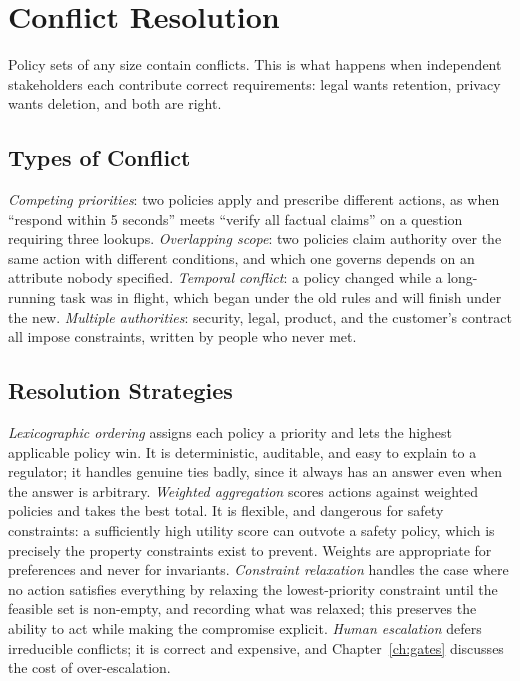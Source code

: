 \documentclass[11pt]{book}
\begin{document}
\section{Conflict Resolution}

Policy sets of any size contain conflicts. This is what happens when independent stakeholders each contribute correct requirements: legal wants retention, privacy wants deletion, and both are right.

\subsection{Types of Conflict}

\textit{Competing priorities}: two policies apply and prescribe different actions, as when ``respond within 5 seconds'' meets ``verify all factual claims'' on a question requiring three lookups. \textit{Overlapping scope}: two policies claim authority over the same action with different conditions, and which one governs depends on an attribute nobody specified. \textit{Temporal conflict}: a policy changed while a long-running task was in flight, which began under the old rules and will finish under the new. \textit{Multiple authorities}: security, legal, product, and the customer's contract all impose constraints, written by people who never met.

\subsection{Resolution Strategies}

\textit{Lexicographic ordering} assigns each policy a priority and lets the highest applicable policy win. It is deterministic, auditable, and easy to explain to a regulator; it handles genuine ties badly, since it always has an answer even when the answer is arbitrary. \textit{Weighted aggregation} scores actions against weighted policies and takes the best total. It is flexible, and dangerous for safety constraints: a sufficiently high utility score can outvote a safety policy, which is precisely the property constraints exist to prevent. Weights are appropriate for preferences and never for invariants. \textit{Constraint relaxation} handles the case where no action satisfies everything by relaxing the lowest-priority constraint until the feasible set is non-empty, and recording what was relaxed; this preserves the ability to act while making the compromise explicit. \textit{Human escalation} defers irreducible conflicts; it is correct and expensive, and Chapter~\ref{ch:gates} discusses the cost of over-escalation.
\end{document}
